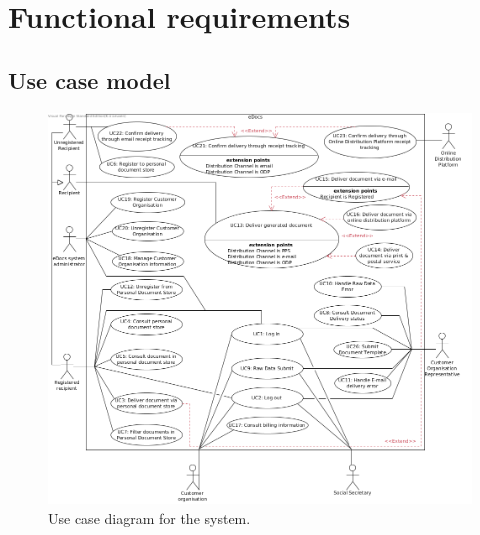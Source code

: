 \documentclass[a4paper,10pt]{article}
\begin{document}
\section{Functional requirements}\label{sec:functional}
\subsection*{Use case model}

\begin{figure}[!htp]
    \centering
    \includegraphics[width=\textwidth]{Use_case_diagram.png}
    \caption{Use case diagram for the system.}\label{fig:use_case_model}
\end{figure}
\end{document}
